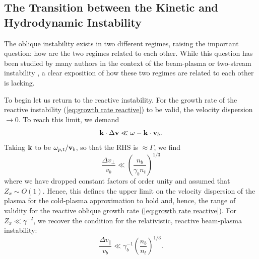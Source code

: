 \documentclass[usenatbib,iop,apj,numberedappendix]{aeb_emulateapj_2015}
\newcommand\bmath[1] {\mbox{\boldmath$\rm #1$}}
\newcommand{\vel}{\ensuremath{\bmath{v}}}
\newcommand{\kvec}{\ensuremath{\bmath{k}}}
\begin{document}
% 
% 

\subsection{The Transition between the Kinetic and Hydrodynamic Instability}\label{sec:transition}

The oblique instability exists in two different regimes, raising the important question: how are the two regimes related to each other. While this question has been studied by many authors in the context of the beam-plasma or two-stream instability \citep[see for instance][]{Melrose86,Boyd},  a clear exposition of how these two regimes are related to each other is lacking.  

To begin let us return to the reactive instability.  For the growth rate of the reactive instability (\ref{eq:growth rate reactive}) to be valid, the velocity dispersion $\rightarrow 0$.   To reach this limit, we demand
\begin{equation}
 \kvec\cdot\Delta \vel \ll \omega - \kvec\cdot\vel_b.
\end{equation}
Taking $\kvec$ to be $\omega_{p,t}/\vel_b$, so that the RHS is $\approx \Gamma$, we find
\begin{equation}\label{eq:oblique reactive regime}
 \frac{\Delta v_{\perp}}{v_b} \ll \left(\frac{n_b}{\gamma_b n_t}\right)^{1/3}
\end{equation}
where we have dropped constant factors of order unity and assumed that $Z_x \sim O(1)$.  Hence, this defines the upper limit on the velocity dispersion of the plasma for the cold-plasma approximation to hold and, hence, the range of validity for the reactive oblique growth rate (\ref{eq:growth rate reactive}).  For $Z_x \ll \gamma^{-2}$, we recover the condition for the relativistic, reactive beam-plasma instability:
\begin{equation}\label{eq:bp reactive regime}
\frac{\Delta v_{\parallel}}{v_b} \ll \gamma_b^{-1}\left(\frac{n_b}{n_t}\right)^{1/3}.
\end{equation}
\end{document}
